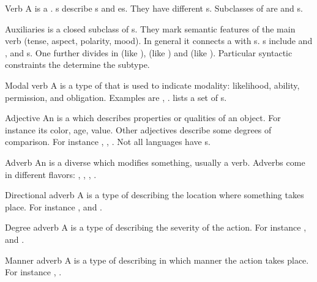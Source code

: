 \begin{df}{Verb}
A \sb{} is a . \sb{}s describe s and es. They have different s. Subclasses of \sb{} are  and s.
\end{df}
\begin{df}{Auxiliaries}
\sb{} is a closed subclass of s. They mark semantic features of the main verb (tense, aspect, polarity, mood). In general it connects a  with s. \sb{}s include  and ,  and s. One further divides \sb{} in  (like ),  (like ) and  (like ). Particular syntactic constraints the determine the subtype.
\end{df}
\begin{df}{Modal verb}
A \sb{} is a type of  that is used to indicate modality: likelihood, ability, permission, and obligation. Examples are , .  lists a set of \sb{}s.
\end{df}
\begin{df}{Adjective}
An \sb{} is a  which describes properties or qualities of an object. For instance its color, age, value. Other adjectives describe some degrees of comparison. For instance , , . Not all languages have \sb{}s.
\end{df}
\begin{df}{Adverb}
An \sb{} is a diverse  which modifies something, usually a verb. Adverbs come in different flavors: , , , .
\end{df}
\begin{df}{Directional adverb}
A \sb{} is a type of  describing the location where something takes place. For instance ,  and .
\end{df}
\begin{df}{Degree adverb}
A \sb{} is a type of  describing the severity of the action. For instance ,  and .
\end{df}
\begin{df}{Manner adverb}
A \sb{} is a type of  describing in which manner the action takes place. For instance , .
\end{df}
